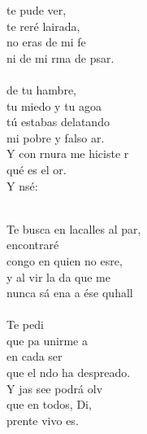 \begin{cancion}%
	 te pude ver,\\
	te reré lairada,\\
no eras de mi fe \\
	ni de mi rma de psar.\\
\jump\\
	 de tu hambre, \\
	tu miedo y tu agoa \\
tú estabas delatando\\
	mi pobre y falso ar.\\
	Y con rnura me hiciste r \\
	qué es el or.\\
	Y nsé:\\\jump\\
	\begin{chorus}%
	Te busca en lacalles al par,\\
	 encontraré \\
	congo en quien no esre,\\
	y al vir la da que me \\
	nunca sá ena a ése quhall\\
\jump\\
	Te pedi \\
	que pa unirme a      \\
en cada ser\\
	que el ndo ha despreado.\\
	Y jas see podrá olv \\
	que en todos, Di,\\
	prente vivo es. \\
	\end{chorus}%
	\jump\\
\end{cancion}%
